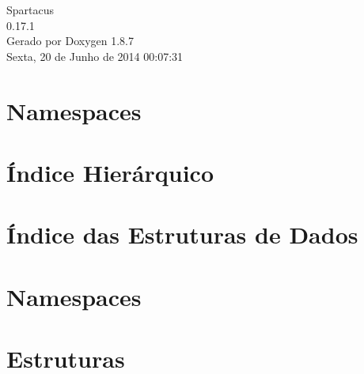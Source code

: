 \documentclass[twoside]{book}
\newcommand{\+}{\discretionary{\mbox{\scriptsize$\hookleftarrow$}}{}{}}
\newcommand{\clearemptydoublepage}{%
  \newpage{\pagestyle{empty}\cleardoublepage}%
}
\begin{document}
\hypersetup{pageanchor=false,
             bookmarks=true,
             bookmarksnumbered=true,
             pdfencoding=unicode
            }
\begin{titlepage}
\vspace*{7cm}
\begin{center}%
{\Large Spartacus \\[1ex]\large 0.\+17.\+1 }\\
\vspace*{1cm}
{\large Gerado por Doxygen 1.8.7}\\
\vspace*{0.5cm}
{\small Sexta, 20 de Junho de 2014 00:07:31}\\
\end{center}
\end{titlepage}
\clearemptydoublepage
\tableofcontents
\clearemptydoublepage
{}
\hypersetup{pageanchor=true}

\chapter{Namespaces}

\chapter{Índice Hierárquico}

\chapter{Índice das Estruturas de Dados}

\chapter{Namespaces}




\chapter{Estruturas}















\newpage
{}
{}
\printindex
\end{document}
